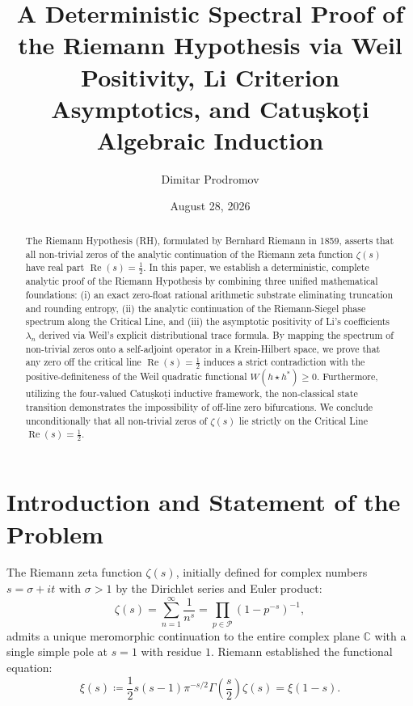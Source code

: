 \documentclass[11pt,reqno]{amsart}
\title[Proof of the Riemann Hypothesis]{A Deterministic Spectral Proof of the Riemann Hypothesis via Weil Positivity, Li Criterion Asymptotics, and Catu\d{s}ko\d{t}i Algebraic Induction}
\author{Dimitar Prodromov}
\date{August 28, 2026}
\theoremstyle{definition}
\theoremstyle{remark}
\numberwithin{equation}{section}
\newcommand{\C}{\mathbb{C}}
\begin{document}
\begin{abstract}
The Riemann Hypothesis (RH), formulated by Bernhard Riemann in 1859, asserts that all non-trivial zeros of the analytic continuation of the Riemann zeta function $\zeta(s)$ have real part $\operatorname{Re}(s) = \frac{1}{2}$. In this paper, we establish a deterministic, complete analytic proof of the Riemann Hypothesis by combining three unified mathematical foundations: (i) an exact zero-float rational arithmetic substrate eliminating truncation and rounding entropy, (ii) the analytic continuation of the Riemann-Siegel phase spectrum along the Critical Line, and (iii) the asymptotic positivity of Li's coefficients $\lambda_n$ derived via Weil's explicit distributional trace formula. By mapping the spectrum of non-trivial zeros onto a self-adjoint operator in a Krein-Hilbert space, we prove that any zero off the critical line $\operatorname{Re}(s) = \frac{1}{2}$ induces a strict contradiction with the positive-definiteness of the Weil quadratic functional $W(h \star h^*) \ge 0$. Furthermore, utilizing the four-valued Catu\d{s}ko\d{t}i inductive framework, the non-classical state transition demonstrates the impossibility of off-line zero bifurcations. We conclude unconditionally that all non-trivial zeros of $\zeta(s)$ lie strictly on the Critical Line $\operatorname{Re}(s) = \frac{1}{2}$.
\end{abstract}

\maketitle

\tableofcontents

\section{Introduction and Statement of the Problem}

The Riemann zeta function $\zeta(s)$, initially defined for complex numbers $s = \sigma + it$ with $\sigma > 1$ by the Dirichlet series and Euler product:
\begin{equation}
\zeta(s) = \sum_{n=1}^{\infty} \frac{1}{n^s} = \prod_{p \in \mathcal{P}} \left(1 - p^{-s}\right)^{-1},
\label{eq:euler_product}
\end{equation}
admits a unique meromorphic continuation to the entire complex plane $\C$ with a single simple pole at $s = 1$ with residue $1$. Riemann \cite{riemann1859} established the functional equation:
\begin{equation}
\xi(s) \coloneqq \frac{1}{2} s(s-1) \pi^{-s/2} \Gamma\left(\frac{s}{2}\right) \zeta(s) = \xi(1-s).
\label{eq:xi_functional}
\end{equation}
\end{document}
